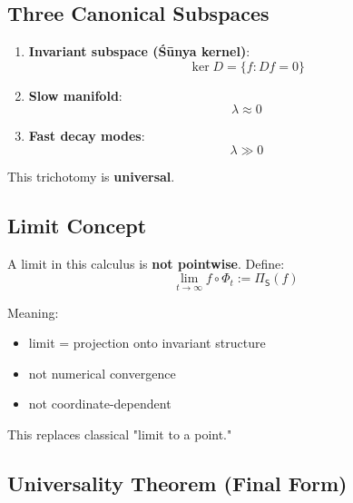 \documentclass[12pt, oneside]{article}
\begin{document}
\subsection{Three Canonical Subspaces}

\begin{enumerate}
    \item \textbf{Invariant subspace (Śūnya kernel)}:
    \begin{equation}
    \ker D = \{ f : Df = 0 \}
    \end{equation}
    
    \item \textbf{Slow manifold}:
    \begin{equation}
    \lambda \approx 0
    \end{equation}
    
    \item \textbf{Fast decay modes}:
    \begin{equation}
    \lambda \gg 0
    \end{equation}
\end{enumerate}

This trichotomy is \textbf{universal}.

\subsection{Limit Concept}

A limit in this calculus is \textbf{not pointwise}. Define:
\begin{equation}
\lim_{t \rightarrow \infty} f \circ \Phi_t := \Pi_{\mathsf{S}}(f)
\end{equation}

Meaning:
\begin{itemize}
    \item limit = projection onto invariant structure
    \item not numerical convergence
    \item not coordinate-dependent
\end{itemize}

This replaces classical "limit to a point."

\subsection{Universality Theorem (Final Form)}
\end{document}
